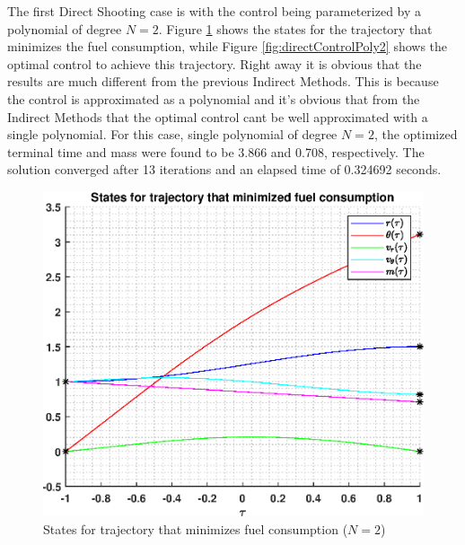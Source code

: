\documentclass[]{article}
\begin{document}
The first Direct Shooting case is with the control being parameterized by a polynomial of degree \(N = 2\). Figure \ref{fig:directStatesPoly2} shows the states for the trajectory that minimizes the fuel consumption, while Figure \ref{fig:directControlPoly2} shows the optimal control to achieve this trajectory. Right away it is obvious that the results are much different from the previous Indirect Methods. This is because the control is approximated as a polynomial and it's obvious that from the Indirect Methods that the optimal control cant be well approximated with a single polynomial. For this case, single polynomial of degree \(N = 2\), the optimized terminal time and mass were found to be 3.866 and 0.708, respectively. The solution converged after 13 iterations and an elapsed time of 0.324692 seconds.
\begin{figure}
	\centering
	\includegraphics[scale=0.75]{directStatesPoly2.eps}
	\caption{States for trajectory that minimizes fuel consumption (\(N = 2\))}
	\label{fig:directStatesPoly2}
\end{figure}
\end{document}
